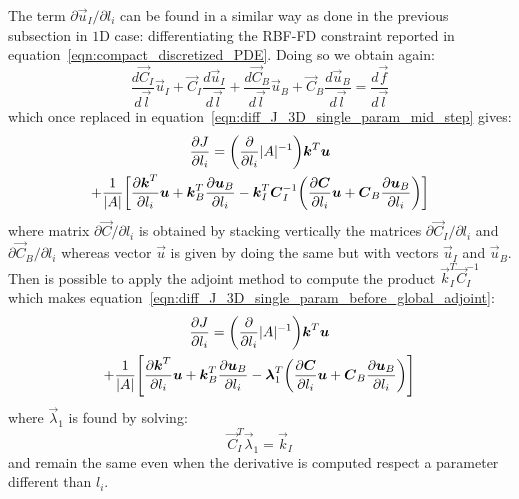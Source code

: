 The term $\partial\vec{u}_I/\partial l_i$ can be found in a similar way as done in the previous subsection in $1$D case: differentiating the RBF-FD constraint reported in equation~\eqref{eqn:compact_discretized_PDE}. Doing so we obtain again:
\begin{equation}
	\frac{d\vec{C}_I}{d\vec{l}} \vec{u}_I + \vec{C}_I \frac{d\vec{u}_I}{d\vec{l}} + \frac{d\vec{C}_B}{d\vec{l}} \vec{u}_B + \vec{C}_B \frac{d\vec{u}_B}{d\vec{l}} =
	\frac{d\vec{f}}{d\vec{l}}
\end{equation}
which once replaced in equation~\eqref{eqn:diff_J_3D_single_param_mid_step} gives:
\begin{multline}
	\label{eqn:diff_J_3D_single_param_before_global_adjoint}
	\frac{\partial J}{\partial l_i} = \biggl( \frac{\partial}{\partial l_i} \lvert A\rvert^{-1} \biggr) \boldsymbol{k}^T \boldsymbol{u} \\ + \frac{1}{\lvert A\rvert} \biggl[ \frac{\partial \boldsymbol{k}^T}{\partial l_i}\boldsymbol{u} + \boldsymbol{k}_B^T \frac{\partial \boldsymbol{u}_B}{\partial l_i} - \boldsymbol{k}_I^T \boldsymbol{C}_I^{-1} \biggl( \frac{\partial \boldsymbol{C}}{\partial l_i}\boldsymbol{u} + \boldsymbol{C}_B\frac{\partial \boldsymbol{u}_B}{\partial l_i}\biggr) \biggr]
\end{multline}
where matrix $\partial \vec{C} / \partial l_i$ is obtained by stacking vertically the matrices $\partial \vec{C}_I / \partial l_i$ and $\partial \vec{C}_B / \partial l_i$ whereas vector $\vec{u}$ is given by doing the same but with vectors $\vec{u}_I$ and $\vec{u}_B$.
Then is possible to apply the adjoint method to compute the product $\vec{k}_I^T \vec{C}_I^{-1}$ which makes equation~\eqref{eqn:diff_J_3D_single_param_before_global_adjoint}:
\begin{multline}
	\label{eqn:diff_J_3D_single_param_after_global_adjoint}
	\frac{\partial J}{\partial l_i} = \biggl( \frac{\partial}{\partial l_i} \lvert A\rvert^{-1} \biggr) \boldsymbol{k}^T \boldsymbol{u} \\ + \frac{1}{\lvert A\rvert} \Biggl[ \frac{\partial \boldsymbol{k}^T}{\partial l_i}\boldsymbol{u} + \boldsymbol{k}_B^T \frac{\partial \boldsymbol{u}_B}{\partial l_i} - \boldsymbol{\lambda}_1^T \biggl( \frac{\partial \boldsymbol{C}}{\partial l_i}\boldsymbol{u} + \boldsymbol{C}_B\frac{\partial \boldsymbol{u}_B}{\partial l_i}\biggr) \Biggr]
\end{multline}
where $\vec{\lambda}_1$ is found by solving:
\begin{equation}
	\vec{C}_I^T \vec{\lambda}_1 = \vec{k}_I
\end{equation}
and remain the same even when the derivative is computed respect a parameter different than $l_i$.

